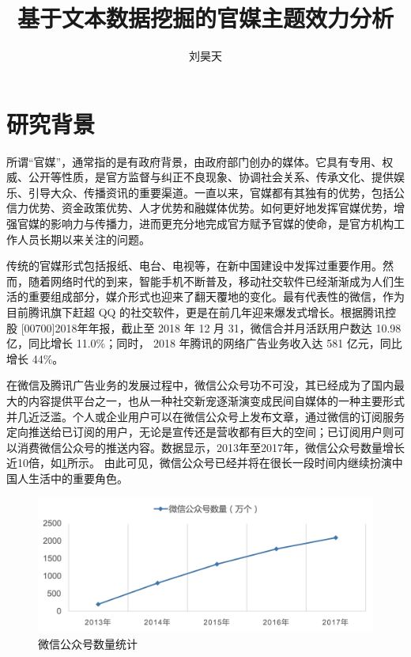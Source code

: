 \documentclass[a4paper,12pt,UTF8]{article}
\title{基于文本数据挖掘的官媒主题效力分析}
\author{刘昊天}
\begin{document}
    \maketitle
    \section{研究背景}
    所谓“官媒”，通常指的是有政府背景，由政府部门创办的媒体。它具有专用、权威、公开等性质，是官方监督与纠正不良现象、协调社会关系、传承文化、提供娱乐、引导大众、传播资讯的重要渠道\cite{guanmei}。一直以来，官媒都有其独有的优势，包括公信力优势、资金政策优势、人才优势和融媒体优势\cite{李志明2017区域性官媒和自媒体微信公众号差异化分析}。如何更好地发挥官媒优势，增强官媒的影响力与传播力，进而更充分地完成官方赋予官媒的使命，是官方机构工作人员长期以来关注的问题。

    传统的官媒形式包括报纸、电台、电视等，在新中国建设中发挥过重要作用。然而，随着网络时代的到来，智能手机不断普及，移动社交软件已经渐渐成为人们生活的重要组成部分，媒介形式也迎来了翻天覆地的变化。最有代表性的微信，作为目前腾讯旗下赶超 QQ 的社交软件，更是在前几年迎来爆发式增长。根据腾讯控股 [00700]2018年年报，截止至 2018 年 12 月 31，微信合并月活跃用户数达 10.98 亿，同比增长 11.0\%；同时， 2018 年腾讯的网络广告业务收入达 581 亿元，同比增长 44\%。

    在微信及腾讯广告业务的发展过程中，微信公众号功不可没，其已经成为了国内最大的内容提供平台之一，也从一种社交新宠逐渐演变成民间自媒体的一种主要形式并几近泛滥。个人或企业用户可以在微信公众号上发布文章，通过微信的订阅服务定向推送给已订阅的用户，无论是宣传还是营收都有巨大的空间；已订阅用户则可以消费微信公众号的推送内容。数据显示，2013年至2017年，微信公众号数量增长近10倍，如\cref{fig:pub}所示。
    由此可见，微信公众号已经并将在很长一段时间内继续扮演中国人生活中的重要角色。

    \begin{figure}[htbp]
      \centering
      \includegraphics[width=0.9\linewidth]{pub.png}
      \caption{微信公众号数量统计}
      \label{fig:pub}
    \end{figure}
\end{document}
